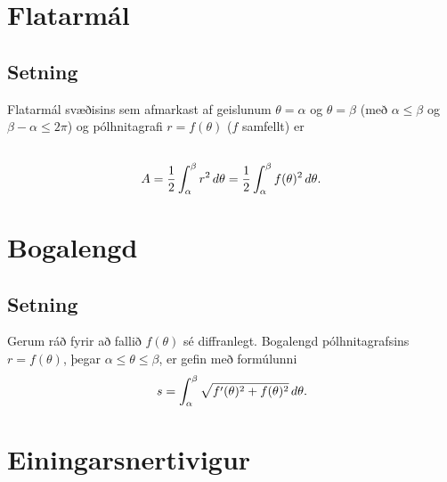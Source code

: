 \documentclass[a4paper,10pt,icelandic]{sphinxmanual}
\begin{document}

\section{Flatarmál}
\label{Kafli1:flatarmal}\label{Kafli1:index-11}

\subsection{Setning}
\label{Kafli1:id12}
Flatarmál svæðisins sem afmarkast af geislunum \(\theta=\alpha\) og
\(\theta=\beta\) (með \(\alpha\leq \beta\) og
\(\beta-\alpha\leq 2\pi\)) og pólhnitagrafi \(r=f(\theta)\)
(\(f\) samfellt) er
\begin{gather}
\begin{split}\displaystyle\end{split}\notag\\\begin{split}A=\frac{1}{2}\int_\alpha^\beta r^2\,d\theta
=\frac{1}{2}\int_\alpha^\beta f(\theta)^2\,d\theta.\end{split}\notag
\end{gather}

\section{Bogalengd}
\label{Kafli1:index-12}\label{Kafli1:bogalengd}

\subsection{Setning}
\label{Kafli1:id13}
Gerum ráð fyrir að fallið \(f(\theta)\) sé diffranlegt. Bogalengd
pólhnitagrafsins \(r=f(\theta)\), þegar
\(\alpha\leq\theta\leq\beta\), er gefin með formúlunni
\begin{gather}
\begin{split}\displaystyle s=\int_\alpha^\beta \sqrt{f'(\theta)^2+f(\theta)^2}\,d\theta.\end{split}\notag
\end{gather}

\section{Einingarsnertivigur}
\label{Kafli1:einingarsnertivigur}
\end{document}
